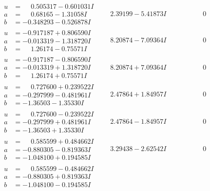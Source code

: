 \documentclass[1p]{elsarticle_modified}
\theoremstyle{definition}
\begin{document}
$$\begin{array}{c|c|c}
\begin{aligned}
u &= \phantom{-}0.505317 - 0.601031 I \\
a &= \phantom{-}0.68165 - 1.31058 I \\
b &= -0.348293 - 0.526878 I\end{aligned}
 & \phantom{-}2.39199 - 5.41873 I & \phantom{-0.000000 } 0 \\ \hline\begin{aligned}
u &= -0.917187 + 0.806590 I \\
a &= -0.013319 - 1.318720 I \\
b &= \phantom{-}1.26174 - 0.75571 I\end{aligned}
 & \phantom{-}8.20874 - 7.09364 I & \phantom{-0.000000 } 0 \\ \hline\begin{aligned}
u &= -0.917187 - 0.806590 I \\
a &= -0.013319 + 1.318720 I \\
b &= \phantom{-}1.26174 + 0.75571 I\end{aligned}
 & \phantom{-}8.20874 + 7.09364 I & \phantom{-0.000000 } 0 \\ \hline\begin{aligned}
u &= \phantom{-}0.727600 + 0.239522 I \\
a &= -0.297999 - 0.481961 I \\
b &= -1.36503 - 1.35330 I\end{aligned}
 & \phantom{-}2.47864 + 1.84957 I & \phantom{-0.000000 } 0 \\ \hline\begin{aligned}
u &= \phantom{-}0.727600 - 0.239522 I \\
a &= -0.297999 + 0.481961 I \\
b &= -1.36503 + 1.35330 I\end{aligned}
 & \phantom{-}2.47864 - 1.84957 I & \phantom{-0.000000 } 0 \\ \hline\begin{aligned}
u &= \phantom{-}0.585599 + 0.484662 I \\
a &= -0.880305 - 0.819363 I \\
b &= -1.048100 + 0.194585 I\end{aligned}
 & \phantom{-}3.29438 - 2.62542 I & \phantom{-0.000000 } 0 \\ \hline\begin{aligned}
u &= \phantom{-}0.585599 - 0.484662 I \\
a &= -0.880305 + 0.819363 I \\
b &= -1.048100 - 0.194585 I\end{aligned}

\end{array}$$
\end{document}
